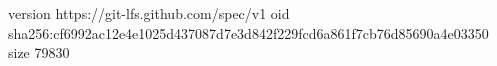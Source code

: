 version https://git-lfs.github.com/spec/v1
oid sha256:cf6992ac12e4e1025d437087d7e3d842f229fcd6a861f7cb76d85690a4e03350
size 79830
